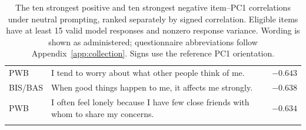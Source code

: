 \begin{table}[!t]
\begin{tabular}{@{}p{}p{}r@{}}
PWB & I tend to worry about what other people think of me. & $-0.643$ \\
BIS/BAS & When good things happen to me, it affects me strongly. & $-0.638$ \\
PWB & I often feel lonely because I have few close friends with whom to share my concerns. & $-0.634$ \\
\addlinespace
\bottomrule
\end{tabular}
\caption{The ten strongest positive and ten strongest negative item--PC1
correlations under neutral prompting, ranked separately by signed correlation.
Eligible items have at least 15 valid model responses and nonzero response
variance. Wording is shown as administered; questionnaire abbreviations follow
Appendix~\ref{app:collection}. Signs use the reference PC1 orientation.}
\label{tab:pc1_item_examples}
\end{table}
